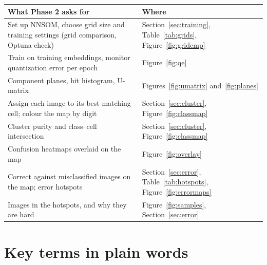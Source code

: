 \documentclass[11pt]{article}
\begin{document}
{\small
\renewcommand{\arraystretch}{1.12}
\begin{tabularx}{\textwidth}{|>{\raggedright\arraybackslash}p{}|X|}
\hline
\textbf{What Phase 2 asks for} & \textbf{Where} \\ \hline
Set up NNSOM, choose grid size and training settings (grid comparison, Optuna check) & Section~\ref{sec:training}, Table~\ref{tab:grids}, Figure~\ref{fig:gridcmp} \\ \hline
Train on training embeddings, monitor quantization error per epoch & Figure~\ref{fig:qe} \\ \hline
Component planes, hit histogram, U-matrix & Figures~\ref{fig:umatrix} and~\ref{fig:planes} \\ \hline
Assign each image to its best-matching cell; colour the map by digit & Section~\ref{sec:cluster}, Figure~\ref{fig:classmap} \\ \hline
Cluster purity and class--cell intersection & Section~\ref{sec:cluster}, Figure~\ref{fig:classmap} \\ \hline
Confusion heatmaps overlaid on the map & Figure~\ref{fig:overlay} \\ \hline
Correct against misclassified images on the map; error hotspots & Section~\ref{sec:error}, Table~\ref{tab:hotspots}, Figure~\ref{fig:errormaps} \\ \hline
Images in the hotspots, and why they are hard & Figure~\ref{fig:samples}, Section~\ref{sec:error} \\ \hline
\end{tabularx}}

\section{Key terms in plain words}
\end{document}
